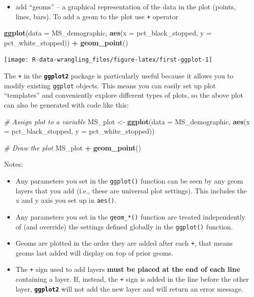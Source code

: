\documentclass[]{book}
\newenvironment{Shaded}{\begin{snugshade}}{\end{snugshade}}
\newcommand{\CommentTok}[1]{\textcolor[rgb]{0.56,0.35,0.01}{\textit{#1}}}
\newcommand{\DataTypeTok}[1]{\textcolor[rgb]{0.13,0.29,0.53}{#1}}
\newcommand{\KeywordTok}[1]{\textcolor[rgb]{0.13,0.29,0.53}{\textbf{#1}}}
\newcommand{\NormalTok}[1]{#1}
\newcommand{\OperatorTok}[1]{\textcolor[rgb]{0.81,0.36,0.00}{\textbf{#1}}}
\newcommand{\StringTok}[1]{\textcolor[rgb]{0.31,0.60,0.02}{#1}}
\providecommand{\tightlist}{%
  \setlength{\itemsep}{0pt}\setlength{\parskip}{0pt}}
\begin{document}
\begin{itemize}
\tightlist
\item
  add ``geoms'' -- a graphical representation of the data in the plot (points, lines, bars). To add a geom to the plot use \texttt{+} operator
\end{itemize}

\begin{Shaded}
\begin{Highlighting}[]
\KeywordTok{ggplot}\NormalTok{(}\DataTypeTok{data =}\NormalTok{ MS_demographic, }\KeywordTok{aes}\NormalTok{(}\DataTypeTok{x =}\NormalTok{ pct_black_stopped, }\DataTypeTok{y =}\NormalTok{ pct_white_stopped)) }\OperatorTok{+}
\StringTok{  }\KeywordTok{geom_point}\NormalTok{()}
\end{Highlighting}
\end{Shaded}

\texttt{[image: R-data-wrangling\_files/figure-latex/first-ggplot-1]}

The \texttt{+} in the \textbf{\texttt{ggplot2}} package is particularly useful because it allows you
to modify existing \texttt{ggplot} objects. This means you can easily set up plot
``templates'' and conveniently explore different types of plots, so the above
plot can also be generated with code like this:

\begin{Shaded}
\begin{Highlighting}[]
\CommentTok{# Assign plot to a variable}
\NormalTok{MS_plot <-}\StringTok{ }\KeywordTok{ggplot}\NormalTok{(}\DataTypeTok{data =}\NormalTok{ MS_demographic, }\KeywordTok{aes}\NormalTok{(}\DataTypeTok{x =}\NormalTok{ pct_black_stopped, }\DataTypeTok{y =}\NormalTok{ pct_white_stopped))}

\CommentTok{# Draw the plot}
\NormalTok{MS_plot }\OperatorTok{+}\StringTok{ }\KeywordTok{geom_point}\NormalTok{()}
\end{Highlighting}
\end{Shaded}

Notes:

\begin{itemize}
\tightlist
\item
  Any parameters you set in the \texttt{ggplot()} function can be seen by any geom layers
  that you add (i.e., these are universal plot settings). This includes the x and y axis you set up in \texttt{aes()}.
\item
  Any parameters you set in the \texttt{geom\_*()} function are treated independently of (and override) the settings defined globally in the \texttt{ggplot()} function.
\item
  Geoms are plotted in the order they are added after each \texttt{+}, that means geoms last added will display on top of prior geoms.
\item
  The \texttt{+} sign used to add layers \textbf{must be placed at the end of each line} containing
  a layer. If, instead, the \texttt{+} sign is added in the line before the other layer,
  \textbf{\texttt{ggplot2}} will not add the new layer and will return an error message.
\end{itemize}
\end{document}
